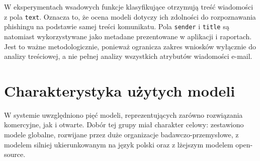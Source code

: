 \documentclass[12pt,a4paper,openany]{report}
\begin{document}
W eksperymentach wsadowych funkcje klasyfikujące otrzymują treść wiadomości z pola \texttt{text}. Oznacza to, że ocena modeli dotyczy ich zdolności do rozpoznawania phishingu na podstawie samej treści komunikatu. Pola \texttt{sender} i \texttt{title} są natomiast wykorzystywane jako metadane prezentowane w aplikacji i raportach. Jest to ważne metodologicznie, ponieważ ogranicza zakres wniosków wyłącznie do analizy treściowej, a nie pełnej analizy wszystkich atrybutów wiadomości e-mail.

\section{Charakterystyka użytych modeli}

W systemie uwzględniono pięć modeli, reprezentujących zarówno rozwiązania komercyjne, jak i otwarte. Dobór tej grupy miał charakter celowy: zestawiono modele globalne, rozwijane przez duże organizacje badawczo-przemysłowe, z modelem silniej ukierunkowanym na język polski oraz z lżejszym modelem open-source.
\end{document}
